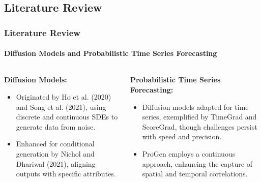 \documentclass[light]{lutbeamer} %
\begin{document}
\subsection{Literature Review}
\begin{frame}
    \frametitle{Literature Review}
    \framesubtitle{Diffusion Models and Probabilistic Time Series Forecasting}

    \begin{columns}[T]
        \begin{column}{0.48\textwidth}
            \textbf{Diffusion Models:}
            \begin{itemize}
                \item Originated by Ho et al. (2020) and Song et al. (2021), using discrete and continuous SDEs to generate data from noise.
                \item Enhanced for conditional generation by Nichol and Dhariwal (2021), aligning outputs with specific attributes.
            \end{itemize}
        \end{column}
        \begin{column}{0.48\textwidth}
            \textbf{Probabilistic Time Series Forecasting:}
            \begin{itemize}
                \item Diffusion models adapted for time series, exemplified by TimeGrad and ScoreGrad, though challenges persist with speed and precision.
                \item ProGen employs a continuous approach, enhancing the capture of spatial and temporal correlations.
            \end{itemize}
        \end{column}
    \end{columns}
\end{frame}
\end{document}
